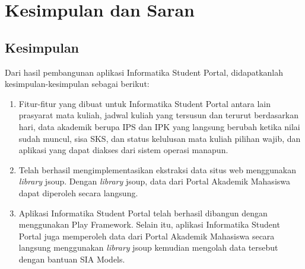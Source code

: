 \chapter{Kesimpulan dan Saran}
\label{chap:kesimpulan_saran}

\section{Kesimpulan}
\label{sec:kesimpulan}
Dari hasil pembangunan aplikasi Informatika Student Portal, didapatkanlah kesimpulan-kesimpulan sebagai berikut:
		\begin{enumerate}
			\item Fitur-fitur yang dibuat untuk Informatika Student Portal antara lain prasyarat mata kuliah, jadwal kuliah yang tersusun dan terurut berdasarkan hari, data akademik berupa IPS dan IPK yang langsung berubah ketika nilai sudah muncul, sisa SKS, dan status kelulusan mata kuliah pilihan wajib, dan aplikasi yang dapat diakses dari sistem operasi manapun.
			\item Telah berhasil mengimplementasikan ekstraksi data situs web menggunakan \textit{library} jsoup. Dengan \textit{library} jsoup, data dari Portal Akademik Mahasiswa dapat diperoleh secara langsung.
			\item Aplikasi Informatika Student Portal telah berhasil dibangun dengan menggunakan Play Framework. Selain itu, aplikasi Informatika Student Portal juga memperoleh data dari Portal Akademik Mahasiswa secara langsung menggunakan \textit{library} jsoup kemudian mengolah data tersebut dengan bantuan SIA Models. 
		\end{enumerate}


